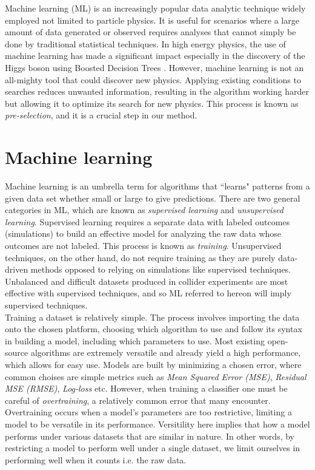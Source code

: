 Machine learning (ML) is an increasingly popular data analytic technique widely employed not limited to particle physics. It is useful for scenarios where a large amount of data generated or observed requires analyses that cannot simply be done by traditional statistical techniques. In high energy physics, the use of machine learning has made a significant impact especially in the discovery of the Higgs boson using Boosted Decision Trees \cite{chatrchyan2012observation, aad2012observation, chen2015higgs}. However, machine learning is not an all-mighty tool that could discover new physics. Applying existing conditions to searches reduces unwanted information, resulting in the algorithm working harder but allowing it to optimize its search for new physics. This process is known as \textit{pre-selection}, and it is a crucial step in our method. \\


\section{Machine learning}
Machine learning is an umbrella term for algorithms that ``learns" patterns from a given data set whether small or large to give predictions. There are two general categories in ML, which are known as \textit{supervised learning} and \textit{unsupervised learning}. Supervised learning requires a separate data with labeled outcomes (simulations) to build an effective model for analyzing the raw data whose outcomes are not labeled. This process is known as \textit{training}. Unsupervised techniques, on the other hand, do not require training as they are purely data-driven methods opposed to relying on simulations like supervised techniques. Unbalanced and difficult datasets produced in collider experiments are most effective with supervised techniques, and so ML referred to hereon will imply supervised techniques. \\

Training a dataset is relatively simple. The process involves importing the data onto the chosen platform, choosing which algorithm to use and follow its syntax in building a model, including which parameters to use. Most existing open-source algorithms are extremely versatile and already yield a high performance, which allows for easy use. Models are built by minimizing a chosen error, where common choises are simple metrics such as \textit{Mean Squared Error (MSE)}, \textit{Residual MSE (RMSE)}, \textit{Log-loss} etc. However, when training a classifier one must be careful of \textit{overtraining}, a relatively common error that many encounter. Overtraining occurs when a model's parameters are too restrictive, limiting a model to be versatile in its performance. Versitility here implies that how a model performs under various datasets that are similar in nature. In other words, by restricting a model to perform well under a single dataset, we limit ourselves in performing well when it counts i.e. the raw data. \\

